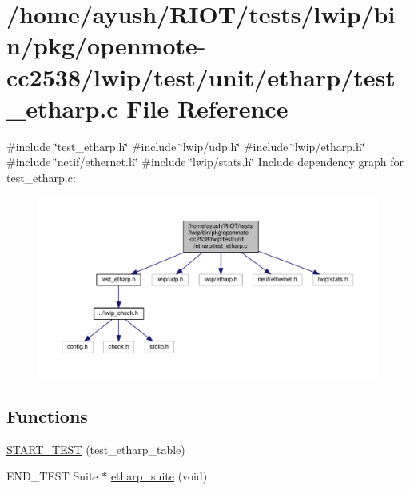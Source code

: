 \hypertarget{openmote-cc2538_2lwip_2test_2unit_2etharp_2test__etharp_8c}{}\section{/home/ayush/\+R\+I\+O\+T/tests/lwip/bin/pkg/openmote-\/cc2538/lwip/test/unit/etharp/test\+\_\+etharp.c File Reference}
\label{openmote-cc2538_2lwip_2test_2unit_2etharp_2test__etharp_8c}
{\ttfamily \#include \char`\"{}test\+\_\+etharp.\+h\char`\"{}}\newline
{\ttfamily \#include \char`\"{}lwip/udp.\+h\char`\"{}}\newline
{\ttfamily \#include \char`\"{}lwip/etharp.\+h\char`\"{}}\newline
{\ttfamily \#include \char`\"{}netif/ethernet.\+h\char`\"{}}\newline
{\ttfamily \#include \char`\"{}lwip/stats.\+h\char`\"{}}\newline
Include dependency graph for test\+\_\+etharp.\+c\+:
\nopagebreak
\begin{figure}[H]
\begin{center}
\leavevmode
\includegraphics[width=350pt]{openmote-cc2538_2lwip_2test_2unit_2etharp_2test__etharp_8c__incl}
\end{center}
\end{figure}
\subsection*{Functions}
\begin{DoxyCompactItemize}
\item 
\hyperlink{openmote-cc2538_2lwip_2test_2unit_2etharp_2test__etharp_8c_a930c3fbfed67d0f010f1ee6a66e13862}{S\+T\+A\+R\+T\+\_\+\+T\+E\+ST} (test\+\_\+etharp\+\_\+table)
\item 
E\+N\+D\+\_\+\+T\+E\+ST Suite $\ast$ \hyperlink{openmote-cc2538_2lwip_2test_2unit_2etharp_2test__etharp_8c_a79605956fdd081741a16545c0adf0168}{etharp\+\_\+suite} (void)
\end{DoxyCompactItemize}
